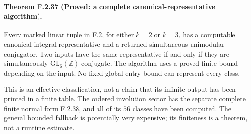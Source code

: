 \paragraph{Theorem F.2.37 (Proved: a complete canonical-representative algorithm).}
Every marked linear tuple in F.2, for either $k=2$ or $k=3$,
has a computable canonical integral representative and a
returned simultaneous unimodular conjugator. Two inputs have
the same representative if and only if they are simultaneously
$\mathrm{GL}_6(\mathbb Z)$ conjugate. The algorithm uses a proved
finite bound depending on the input. No fixed global entry bound
can represent every class.

This is an effective classification, not a claim that its
infinite output has been printed in a finite table. The
ordered involution sector has the separate complete finite
normal form F.2.38, and all of its $56$ classes have been
computed. The general bounded fallback is potentially very
expensive; its finiteness is a theorem, not a runtime estimate.

